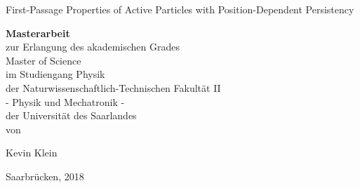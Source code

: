 \clearscrheadings\clearscrplain
\begin{center}

\begin{bfseries}
\begin{Huge}
First-Passage Properties of Active Particles with Position-Dependent Persistency\\
\end{Huge}
\end{bfseries}
\vspace{4cm}
\textbf{Masterarbeit}\\
\vspace{0.4cm}
zur Erlangung des akademischen Grades\\ 
Master of Science  \\
im Studiengang Physik \\
der Naturwissenschaftlich-Technischen Fakultät II \\
- Physik und Mechatronik -  \\
der Universität des Saarlandes \\
\vspace{4 cm}
von\\
\vspace{0.5cm}
\begin{Large}
Kevin Klein \\
\end{Large}
\vspace{1.5cm}
Saarbrücken, 2018


\end{center}
\clearpage
